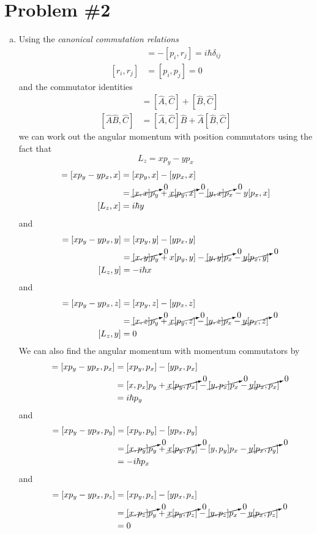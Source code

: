 \documentclass[11pt]{article}
\numberwithin{equation}{section}
\begin{document}
\section{Problem \#2}
\begin{enumerate}[(a)]
\item
Using the \emph{canonical commutation relations}
\begin{align}
[r_i,p_j] &= -[p_i,r_j] = i\hbar\delta_{ij}\\
[r_i,r_j] &= [p_i,p_j] = 0
\end{align}
and the commutator identities
\begin{align}
[\hat{A}+\hat{B},\hat{C}] &= [\hat{A},\hat{C}]+[\hat{B},\hat{C}]\\
[\hat{A}\hat{B},\hat{C}] &= [\hat{A},\hat{C}]\hat{B}+\hat{A}[\hat{B},\hat{C}]
\end{align}
we can work out the angular momentum with position commutators using the fact that
$$L_z = xp_y-yp_x$$
\begin{align*}
[L_z,x] = [xp_y-yp_x, x] &= [xp_y,x] - [yp_x,x]\\
&= \cancelto{0}{[x,x]p_y} + \cancelto{0}{x[p_y,x]} - \cancelto{0}{[y,x]p_x} - y[p_x,x]\\
[L_z,x] &= i\hbar y
\end{align*}
and
\begin{align*}
[L_z,y] = [xp_y-yp_x, y] &= [xp_y,y] - [yp_x,y]\\
&= \cancelto{0}{[x,y]p_y} + x[p_y,y] - \cancelto{0}{[y,y]p_x} - \cancelto{0}{y[p_x,y]}\\
[L_z,y] &= -i\hbar x
\end{align*}
and
\begin{align*}
[L_z,z] = [xp_y-yp_x, z] &= [xp_y,z] - [yp_x,z]\\
&= \cancelto{0}{[x,z]p_y} + \cancelto{0}{x[p_y,z]} - \cancelto{0}{[y,z]p_x} - \cancelto{0}{y[p_x,z]}\\
[L_z,y] &= 0
\end{align*}
We can also find the angular momentum with momentum commutators by
\begin{align*}
[L_z,p_x] = [xp_y-yp_x, p_x] &= [xp_y,p_x] - [yp_x,p_x]\\
&= [x,p_x]p_y + \cancelto{0}{x[p_y,p_x]} - \cancelto{0}{[y,p_x]p_x} - \cancelto{0}{y[p_x,p_x]}\\
&= i\hbar p_y
\end{align*}
and
\begin{align*}
[L_z,p_y] = [xp_y-yp_x, p_y] &= [xp_y,p_y] - [yp_x,p_y]\\
&= \cancelto{0}{[x,p_y]p_y} + \cancelto{0}{x[p_y,p_y]} - [y,p_y]p_x - \cancelto{0}{y[p_x,p_y]}\\
&= -i\hbar p_x
\end{align*}
and
\begin{align*}
[L_z,p_z] = [xp_y-yp_x, p_z] &= [xp_y,p_z] - [yp_x,p_z]\\
&= \cancelto{0}{[x,p_z]p_y} + \cancelto{0}{x[p_y,p_z]} - \cancelto{0}{[y,p_z]p_x} - \cancelto{0}{y[p_x,p_z]}\\
&= 0
\end{align*}


\end{enumerate}
\end{document}
